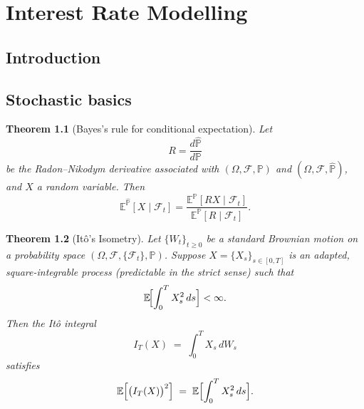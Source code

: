 \documentclass[a4paper,11pt]{book}
\newtheorem{theorem}{Theorem}[section]
\theoremstyle{definition}
\theoremstyle{remark}
\begin{document}
\chapter{Interest Rate Modelling}
\section{Introduction}
\section{Stochastic basics}

\begin{theorem}[Bayes's rule for conditional expectation]
Let 
\[
R = \frac{d\mathbb{\hat{P}}}{d\mathbb{P}}
\]
be the Radon–Nikodym derivative associated with 
\((\Omega, \mathcal{F}, \mathbb{P})\) and \((\Omega, \mathcal{F}, \mathbb{\hat{P}})\),
and \(X\) a random variable. Then
\[
\mathbb{E}^{\mathbb{\hat{P}}}[X \mid \mathcal{F}_t] = 
\frac{\mathbb{E}^{\mathbb{P}}[R X \mid \mathcal{F}_t]}{\mathbb{E}^{\mathbb{P}}[R \mid \mathcal{F}_t]}.
\]
\end{theorem}

\begin{theorem}[It\^o's Isometry]
\label{thm:ito-isometry}
Let $\{W_t\}_{t \ge 0}$ be a standard Brownian motion on a probability space 
$(\Omega, \mathcal{F}, \{\mathcal{F}_t\}, \mathbb{P})$. 
Suppose $X = \{X_s\}_{s \in [0,T]}$ is an \emph{adapted}, 
square-integrable process (predictable in the strict sense) such that
\[
   \mathbb{E}\!\Bigl[\int_0^T X_s^2 \, ds\Bigr] < \infty.
\]
Then the It\^o integral
\[
   I_T(X) \;=\; \int_0^T X_s \, dW_s
\]
satisfies
\[
   \mathbb{E}\Bigl[\bigl(I_T(X)\bigr)^2\Bigr]
   \;=\;
   \mathbb{E}\Bigl[\int_0^T X_s^2 \, ds\Bigr].
\]
\end{theorem}
\end{document}
